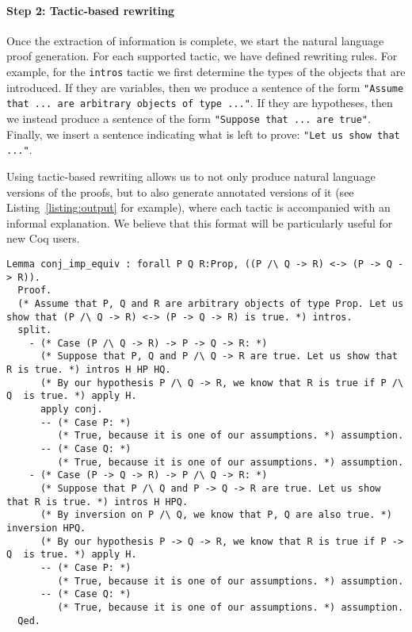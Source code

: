 \documentclass[sigplan,review,9pt]{acmart}\settopmatter{printfolios=true,printccs=false,printacmref=false}
\begin{document}
\paragraph{Step 2: Tactic-based rewriting}
Once the extraction of information is complete, we start the natural language proof generation. For each supported tactic, we have defined rewriting rules. For example, for the \lstinline{intros} tactic we first determine the types of the objects that are introduced. If they are variables, then we produce a sentence of the form \lstinline{"Assume that ... are arbitrary objects of type ..."}. If they are hypotheses, then we instead produce a sentence of the form \lstinline{"Suppose that ... are true"}. Finally, we insert a sentence indicating what is left to prove: \lstinline{"Let us show that ..."}. 

Using tactic-based rewriting allows us to not only produce natural language versions of the proofs, but to also generate annotated versions of it (see Listing~\ref{listing:output} for example), where each tactic is accompanied with an informal explanation. We believe that this format will be particularly useful for new Coq users.

\begin{figure*}
\begin{lstlisting}[label=listing:output, captionpos=b, caption={Output}]
  Lemma conj_imp_equiv : forall P Q R:Prop, ((P /\ Q -> R) <-> (P -> Q -> R)).
  Proof.
  (* Assume that P, Q and R are arbitrary objects of type Prop. Let us show that (P /\ Q -> R) <-> (P -> Q -> R) is true. *) intros.
  split.
    - (* Case (P /\ Q -> R) -> P -> Q -> R: *) 
      (* Suppose that P, Q and P /\ Q -> R are true. Let us show that R is true. *) intros H HP HQ.
      (* By our hypothesis P /\ Q -> R, we know that R is true if P /\ Q  is true. *) apply H.
      apply conj.
      -- (* Case P: *)
         (* True, because it is one of our assumptions. *) assumption.
      -- (* Case Q: *)
         (* True, because it is one of our assumptions. *) assumption.
    - (* Case (P -> Q -> R) -> P /\ Q -> R: *)
      (* Suppose that P /\ Q and P -> Q -> R are true. Let us show that R is true. *) intros H HPQ.
      (* By inversion on P /\ Q, we know that P, Q are also true. *) inversion HPQ.
      (* By our hypothesis P -> Q -> R, we know that R is true if P -> Q  is true. *) apply H.
      -- (* Case P: *)
         (* True, because it is one of our assumptions. *) assumption.
      -- (* Case Q: *)
         (* True, because it is one of our assumptions. *) assumption.
  Qed.
\end{lstlisting}
\end{figure*}
\end{document}
